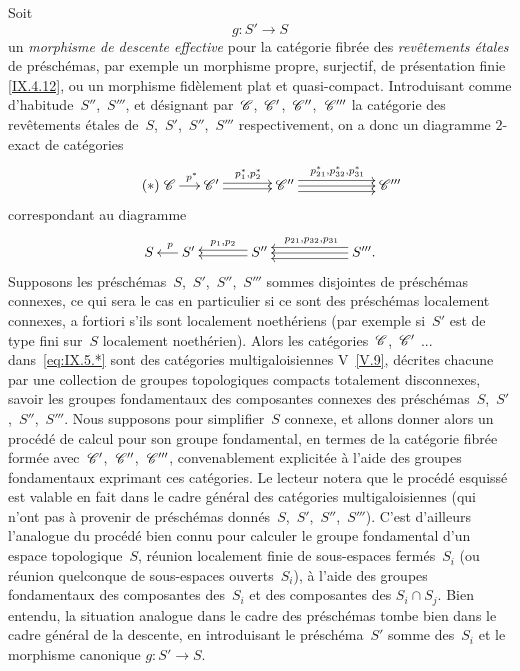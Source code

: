 Soit
$$
g\colon S'\to S
$$
un \emph{morphisme de descente effective} pour la cat\'egorie
fibr\'ee des \emph{revêtements étales} de
pr\'e\-sch\'e\-mas, par exemple un morphisme propre, surjectif, de
pr\'esentation finie \eqref{IX.4.12}, ou un morphisme fid\`element
plat et quasi-compact. Introduisant comme d'habitude~$S''$,~$S'''$,
et d\'esignant par~$\cal{C}$,~$\cal{C}'$,~$\cal{C}''$,~$\cal{C}'''$
la cat\'egorie des rev\^etements \'etales
de~$S$,~$S'$,~$S''$,~$S'''$ respectivement, on a donc un diagramme
$2$-exact de cat\'egories
\begin{equation*}
\label{eq:IX.5.*}
\tag{$*$} 
\xymatrix@C=.5cm{{\cal{C}}\ar[r]^-{~p^*}&{\cal{C}'}\ar@<2pt>[rr]^{p_1^*,p_2^*}\ar@<-2pt>[rr]&&{\cal{C}''}\ar@<4pt>[rrr]^{p_{21}^*,p_{32}^*,p_{31}^*}\ar[rrr]\ar@<-4pt>[rrr]&&&{\cal{C}'''}}
\end{equation*}
correspondant au diagramme
$$
\xymatrix@C=.5cm{{S}&{S'}\ar[l]_-{~p}&&{S''}\ar@<2pt>[ll]\ar@<-2pt>[ll]_-{p_1,p_2}&&&{S'''.}\ar@<4pt>[lll]\ar[lll]\ar@<-4pt>[lll]_{p_{21},p_{32},p_{31}}}
$$
Supposons
les pr\'esch\'emas~$S$,~$S'$,~$S''$,~$S'''$ sommes disjointes de
pr\'esch\'emas connexes, ce qui sera le cas en particulier si ce
sont des pr\'esch\'emas localement connexes, a fortiori s'ils sont
localement noeth\'eriens (par exemple si~$S'$ est de type fini
sur~$S$ localement noeth\'erien). Alors les
cat\'egories~$\cal{C}$,~$\cal{C}'$ ... dans~\eqref{eq:IX.5.*} sont
des cat\'egories multigaloisiennes V~\ref{V.9}, d\'ecrites
chacune par une collection de groupes topologiques compacts totalement
disconnexes, savoir les groupes fondamentaux des composantes connexes
des pr\'esch\'emas~$S$,~$S'$,~$S''$,~$S'''$. Nous supposons pour
simplifier~$S$ connexe, et allons donner alors un proc\'ed\'e de
calcul pour son groupe fondamental, en termes de la cat\'egorie
fibr\'ee form\'ee avec~$\cal{C}'$,~$\cal{C}''$,~$\cal{C}'''$,
convenablement explicit\'ee \`a l'aide des groupes fondamentaux
exprimant ces cat\'egories. Le lecteur notera que le
proc\'ed\'e esquiss\'e est valable en fait dans le cadre
g\'en\'eral des cat\'egories multigaloisiennes (qui n'ont pas
\`a provenir de pr\'esch\'emas
donn\'es~$S$,~$S'$,~$S''$,~$S'''$). C'est d'ailleurs l'analogue du
proc\'ed\'e bien connu pour calculer le groupe fondamental d'un
espace topologique~$S$, r\'eunion localement finie de sous-espaces
ferm\'es~$S_i$ (ou r\'eunion quelconque de sous-espaces
ouverts~$S_i$), \`a l'aide des groupes fondamentaux des composantes
des~$S_i$
et des composantes des $S_i\cap S_j$. Bien entendu, la
situation analogue dans le cadre des pr\'esch\'emas tombe bien
dans le cadre g\'en\'eral de la descente, en introduisant le
pr\'esch\'ema~$S'$ somme des~$S_i$ et le morphisme canonique
$g\colon S'\to S$.

